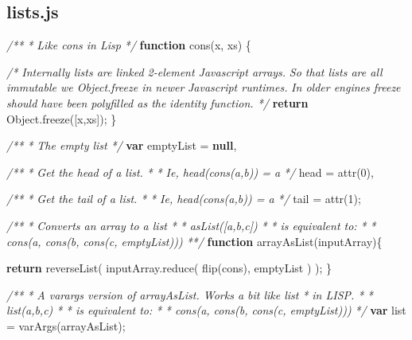 \documentclass[]{article}
\newenvironment{Shaded}{}{}
\newcommand{\KeywordTok}[1]{\textcolor[rgb]{0.00,0.44,0.13}{\textbf{{#1}}}}
\newcommand{\DecValTok}[1]{\textcolor[rgb]{0.25,0.63,0.44}{{#1}}}
\newcommand{\CommentTok}[1]{\textcolor[rgb]{0.38,0.63,0.69}{\textit{{#1}}}}
\newcommand{\OtherTok}[1]{\textcolor[rgb]{0.00,0.44,0.13}{{#1}}}
\newcommand{\FunctionTok}[1]{\textcolor[rgb]{0.02,0.16,0.49}{{#1}}}
\newcommand{\NormalTok}[1]{{#1}}
\begin{document}
\pagebreak

\subsection{lists.js}

\label{src_lists}

\begin{Shaded}
\begin{Highlighting}[]
\CommentTok{/**}
\CommentTok{ * Like cons in Lisp}
\CommentTok{ */}
\KeywordTok{function} \FunctionTok{cons}\NormalTok{(x, xs) \{}
   
   \CommentTok{/* Internally lists are linked 2-element Javascript arrays.}
\CommentTok{    }
\CommentTok{      So that lists are all immutable we Object.freeze in newer }
\CommentTok{      Javascript runtimes.}
\CommentTok{      }
\CommentTok{      In older engines freeze should have been polyfilled as the }
\CommentTok{      identity function. */}
   \KeywordTok{return} \OtherTok{Object}\NormalTok{.}\FunctionTok{freeze}\NormalTok{([x,xs]);}
\NormalTok{\}}

\CommentTok{/**}
\CommentTok{ * The empty list}
\CommentTok{ */}
\KeywordTok{var} \NormalTok{emptyList = }\KeywordTok{null}\NormalTok{,}

\CommentTok{/**}
\CommentTok{ * Get the head of a list.}
\CommentTok{ * }
\CommentTok{ * Ie, head(cons(a,b)) = a}
\CommentTok{ */}
    \NormalTok{head = }\FunctionTok{attr}\NormalTok{(}\DecValTok{0}\NormalTok{),}

\CommentTok{/**}
\CommentTok{ * Get the tail of a list.}
\CommentTok{ * }
\CommentTok{ * Ie, head(cons(a,b)) = a}
\CommentTok{ */}
    \NormalTok{tail = }\FunctionTok{attr}\NormalTok{(}\DecValTok{1}\NormalTok{);}


\CommentTok{/** }
\CommentTok{ * Converts an array to a list }
\CommentTok{ * }
\CommentTok{ *    asList([a,b,c])}
\CommentTok{ * }
\CommentTok{ * is equivalent to:}
\CommentTok{ *    }
\CommentTok{ *    cons(a, cons(b, cons(c, emptyList))) }
\CommentTok{ **/}
\KeywordTok{function} \FunctionTok{arrayAsList}\NormalTok{(inputArray)\{}

   \KeywordTok{return} \FunctionTok{reverseList}\NormalTok{( }
      \OtherTok{inputArray}\NormalTok{.}\FunctionTok{reduce}\NormalTok{(}
         \FunctionTok{flip}\NormalTok{(cons),}
         \NormalTok{emptyList }
      \NormalTok{)}
   \NormalTok{);}
\NormalTok{\}}

\CommentTok{/**}
\CommentTok{ * A varargs version of arrayAsList. Works a bit like list}
\CommentTok{ * in LISP.}
\CommentTok{ * }
\CommentTok{ *    list(a,b,c) }
\CommentTok{ *    }
\CommentTok{ * is equivalent to:}
\CommentTok{ * }
\CommentTok{ *    cons(a, cons(b, cons(c, emptyList)))}
\CommentTok{ */}
\KeywordTok{var} \NormalTok{list = }\FunctionTok{varArgs}\NormalTok{(arrayAsList);}


\end{Highlighting}
\end{Shaded}
\end{document}
